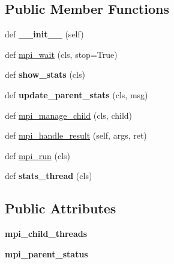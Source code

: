\subsection*{Public Member Functions}
\begin{DoxyCompactItemize}
\item 
\mbox{\label{classCBGM_1_1lib_1_1mpisupport_1_1MpiParent_ae222e290d71602736a5898bdbfc67c27}} 
def {\bfseries \+\_\+\+\_\+init\+\_\+\+\_\+} (self)
\item 
def \hyperlink{classCBGM_1_1lib_1_1mpisupport_1_1MpiParent_ab70a1d7a4775e8b451f9c1797fc6c8c2}{mpi\+\_\+wait} (cls, stop=True)
\item 
\mbox{\label{classCBGM_1_1lib_1_1mpisupport_1_1MpiParent_a4dc6c6972b31f1ef8f48d950926dcd68}} 
def {\bfseries show\+\_\+stats} (cls)
\item 
\mbox{\label{classCBGM_1_1lib_1_1mpisupport_1_1MpiParent_a62195c4571b97756938cc673ee9df5c6}} 
def {\bfseries update\+\_\+parent\+\_\+stats} (cls, msg)
\item 
def \hyperlink{classCBGM_1_1lib_1_1mpisupport_1_1MpiParent_a70917e4e770c9997a04d74f9ac210f21}{mpi\+\_\+manage\+\_\+child} (cls, child)
\item 
def \hyperlink{classCBGM_1_1lib_1_1mpisupport_1_1MpiParent_ab421e046cec4458b87f5fb30a954dd40}{mpi\+\_\+handle\+\_\+result} (self, args, ret)
\item 
def \hyperlink{classCBGM_1_1lib_1_1mpisupport_1_1MpiParent_a223e2c29909cef0f2b08c8a608cdd117}{mpi\+\_\+run} (cls)
\item 
\mbox{\label{classCBGM_1_1lib_1_1mpisupport_1_1MpiParent_a1b6a51bf09048a5b5d7eaf6fef542453}} 
def {\bfseries stats\+\_\+thread} (cls)
\end{DoxyCompactItemize}
\subsection*{Public Attributes}
\begin{DoxyCompactItemize}
\item 
\mbox{\label{classCBGM_1_1lib_1_1mpisupport_1_1MpiParent_a0dc5bba031ec7057b82e3b96f62727a1}} 
{\bfseries mpi\+\_\+child\+\_\+threads}
\item 
\mbox{\label{classCBGM_1_1lib_1_1mpisupport_1_1MpiParent_ac764ad555f810dcafca1ed5726acfd3f}} 
{\bfseries mpi\+\_\+parent\+\_\+status}
\end{DoxyCompactItemize}
